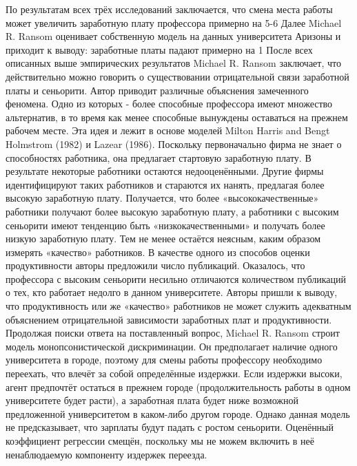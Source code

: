 \documentclass[a4paper, 12pt]{article}
\theoremstyle{definition}
\theoremstyle{plain}
\begin{document}
	По результатам всех трёх исследований заключается, что смена места работы может увеличить заработную плату профессора примерно на 5-6%
	Далее Michael R. Ransom оценивает собственную модель на данных университета Аризоны и приходит к выводу: заработные платы падают примерно на 1%
	После всех описанных выше эмпирических результатов Michael R. Ransom заключает, что действительно можно говорить о существовании отрицательной связи заработной платы и сеньорити. Автор приводит различные объяснения замеченного феномена. Одно из которых - более способные профессора имеют множество альтернатив, в то время как менее способные вынуждены оставаться на прежнем рабочем месте. Эта идея и лежит в основе моделей Milton Harris and Bengt Holmstrom (1982) и Lazear (1986). Поскольку первоначально фирма не знает о способностях работника, она предлагает стартовую заработную плату. В результате некоторые работники остаются недооценёнными. Другие фирмы идентифицируют таких работников и стараются их нанять, предлагая более высокую заработную плату. Получается, что более «высококачественные» работники получают более высокую заработную плату, а работники с высоким сеньорити имеют тенденцию быть «низкокачественными» и получать более низкую заработную плату. Тем не менее остаётся неясным, каким образом измерять «качество» работников. В качестве одного из способов оценки продуктивности авторы предложили число публикаций. Оказалось, что профессора с высоким сеньорити несильно отличаются количеством публикаций о тех, кто работает недолго в данном университете. Авторы пришли к выводу, что продуктивность или же «качество» работников не может служить адекватным объяснением отрицательной зависимости заработных плат и продуктивности.
	Продолжая поиски ответа на поставленный вопрос, Michael R. Ransom строит модель монопсонистической дискриминации. Он предполагает наличие одного университета в городе, поэтому для смены работы профессору необходимо переехать, что влечёт за собой определённые издержки. Если издержки высоки, агент предпочтёт остаться в прежнем городе (продолжительность работы в одном университете будет расти), а заработная плата будет ниже возможной предложенной университетом в каком-либо другом городе. Однако данная модель не предсказывает, что зарплаты будут падать с ростом сеньорити. Оценённый коэффициент регрессии смещён, поскольку мы не можем включить в неё ненаблюдаемую компоненту издержек переезда. 
\end{document}
